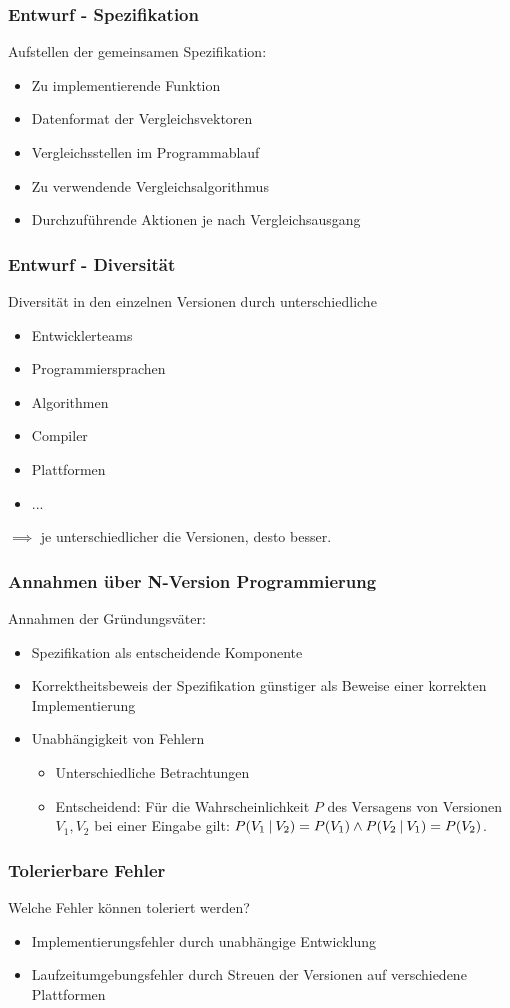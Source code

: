 %
%
\begin{frame}
	\frametitle{Entwurf - Spezifikation}
	Aufstellen der gemeinsamen Spezifikation:
	\begin{itemize}
		\item Zu implementierende Funktion
		\item Datenformat der Vergleichsvektoren
		\item Vergleichsstellen im Programmablauf
		\item Zu verwendende Vergleichsalgorithmus
		\item Durchzuführende Aktionen je nach Vergleichsausgang
	\end{itemize}
\end{frame}
%
%
\begin{frame}
	\frametitle{Entwurf - Diversität}
	Diversität in den einzelnen Versionen durch unterschiedliche
	\begin{itemize}
		\item Entwicklerteams
		\item Programmiersprachen
		\item Algorithmen
		\item Compiler
		\item Plattformen
		\item ...
	\end{itemize}
	$\implies$ je unterschiedlicher die Versionen, desto besser.
\end{frame}
%
%
\begin{frame}
	\frametitle{Annahmen über N-Version Programmierung}
	Annahmen der Gründungsväter:
	\begin{itemize}		
		\item Spezifikation als entscheidende Komponente		
		\item Korrektheitsbeweis der Spezifikation günstiger als Beweise einer korrekten Implementierung
		\pause
		\item Unabhängigkeit von Fehlern
		\begin{itemize}		
			\item Unterschiedliche Betrachtungen
			\item Entscheidend:	Für die Wahrscheinlichkeit $P$ des Versagens von Versionen  $V_{1}, V_{2}$ bei einer Eingabe gilt: $P(V_{1}\:\vert\: V_{2}) = P(V_{1}) \land P(V_{2}\:\vert\: V_{1}) = P(V_{2})$.
		\end{itemize}
	\end{itemize}
\end{frame}
%
%
\begin{frame}
	\frametitle{Tolerierbare Fehler}
	Welche Fehler können toleriert werden?
	\begin{itemize}		
		\item Implementierungsfehler durch unabhängige Entwicklung
		\item Laufzeitumgebungsfehler durch Streuen der Versionen auf verschiedene Plattformen
	\end{itemize}
\end{frame}
%
%
